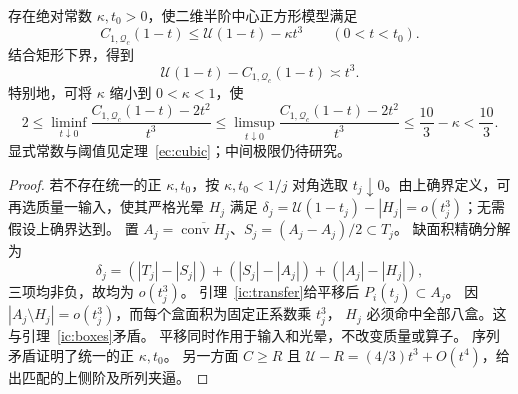 \begin{theorem}[两点包络的三阶亏损及其匹配阶]\label{ic:cubic-gap}
存在绝对常数 $\kappa,t_0>0$，使二维半阶中心正方形模型满足
\[
 C_{1,\mathcal Q_c}(1-t)\le\mathcal U(1-t)-\kappa t^3
 \qquad(0<t<t_0).
\]
结合矩形下界，得到
\[
 \mathcal U(1-t)-C_{1,\mathcal Q_c}(1-t)\asymp t^3.
\]
特别地，可将 $\kappa$ 缩小到 $0<\kappa<1$，使
\[
 2\le\liminf_{t\downarrow0}\frac{C_{1,\mathcal Q_c}(1-t)-2t^2}{t^3}
 \le\limsup_{t\downarrow0}\frac{C_{1,\mathcal Q_c}(1-t)-2t^2}{t^3}
 \le\frac{10}{3}-\kappa<\frac{10}{3}.
\]
显式常数与阈值见定理~\ref{ec:cubic}；中间极限仍待研究。
\end{theorem}
\begin{proof}
若不存在统一的正 $\kappa,t_0$，按 $\kappa,t_0<1/j$ 对角选取
$t_j\downarrow0$。由上确界定义，可再选质量一输入，使其严格光晕 $H_j$ 满足
$\delta_j=\mathcal U(1-t_j)-|H_j|=o(t_j^3)$；无需假设上确界达到。
置 $A_j=\overline{\operatorname{conv}H_j}$、$S_j=(A_j-A_j)/2\subset T_j$。
缺面积精确分解为
\[
 \delta_j=(|T_j|-|S_j|)+(|S_j|-|A_j|)+(|A_j|-|H_j|),
\]
三项均非负，故均为 $o(t_j^3)$。
引理~\ref{ic:transfer}给平移后 $P_i(t_j)\subset A_j$。
因 $|A_j\setminus H_j|=o(t_j^3)$，而每个盒面积为固定正系数乘 $t_j^3$，
$H_j$ 必须命中全部八盒。这与引理~\ref{ic:boxes}矛盾。
平移同时作用于输入和光晕，不改变质量或算子。
序列矛盾证明了统一的正 $\kappa,t_0$。
另一方面 $C\ge R$ 且 $\mathcal U-R=(4/3)t^3+O(t^4)$，给出匹配的上侧阶及所列夹逼。
\end{proof}
